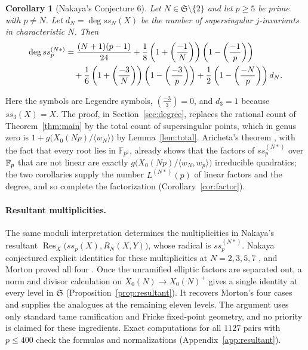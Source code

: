 \documentclass[11pt,a4paper]{article}
\newtheorem{corollary}[theorem]{Corollary}
\theoremstyle{remark}\newtheorem{remark}[theorem]{Remark}
\numberwithin{equation}{section}
\newcommand{\leg}[2]{\left(\frac{#1}{#2}\right)}
\begin{document}
	\begin{corollary}[Nakaya's Conjecture 6]\label{cor:degree}
		Let $N\in\mathfrak S\setminus\{2\}$ and let $p\geq5$ be prime with $p\ne N$. Let $d_N=\deg ss_N(X)$ be the number of supersingular $j$-invariants in characteristic $N$. Then
		\begin{align}
			\deg ss_p^{(N*)}
			&=\frac{(N+1)(p-1)}{24}
			+\frac18\left(1+\leg{-1}{N}\right)\left(1-\leg{-1}{p}\right)\notag\\
			&\quad+\frac16\left(1+\leg{-3}{N}\right)\left(1-\leg{-3}{p}\right)
			+\frac12\left(1-\leg{-N}{p}\right)d_N.\label{eq:C6}
		\end{align}
	\end{corollary}
	
	Here the symbols are Legendre symbols, $\leg{-3}{3}=0$, and $d_3=1$ because $ss_3(X)=X$. The proof, in Section~\ref{sec:degree}, replaces the rational count of Theorem~\ref{thm:main} by the total count of supersingular points, which in genus zero is $1+g\bigl(X_0(Np)/\langle w_N\rangle\bigr)$ by Lemma~\ref{lem:total}. Aricheta's theorem \cite[Theorem 3.1]{Aricheta}, with the fact that every root lies in $\mathbb F_{p^2}$, already shows that the factors of $ss_p^{(N*)}$ over $\mathbb F_p$ that are not linear are exactly $g\bigl(X_0(Np)/\langle w_N,w_p\rangle\bigr)$ irreducible quadratics; the two corollaries supply the number $L^{(N*)}(p)$ of linear factors and the degree, and so complete the factorization (Corollary~\ref{cor:factor}).
	
	\paragraph{Resultant multiplicities.}
	The same moduli interpretation determines the multiplicities in Nakaya's resultant $\operatorname{Res}_X\bigl(ss_p(X),R_N(X,Y)\bigr)$, whose radical is $ss_p^{(N*)}$. Nakaya conjectured explicit identities for these multiplicities at $N=2,3,5,7$ \cite[Conjecture~4]{Nakaya}, and Morton proved all four \cite[Theorems~1, 3 and~5]{MortonFricke}. Once the unramified elliptic factors are separated out, a norm and divisor calculation on $X_0(N)\to X_0(N)^+$ gives a single identity at every level in $\mathfrak S$ (Proposition~\ref{prop:resultant}). It recovers Morton's four cases and supplies the analogues at the remaining eleven levels. The argument uses only standard tame ramification and Fricke fixed-point geometry, and no priority is claimed for these ingredients. Exact computations for all $1127$ pairs with $p\le400$ check the formulas and normalizations (Appendix~\ref{app:resultant}).
	
\end{document}
